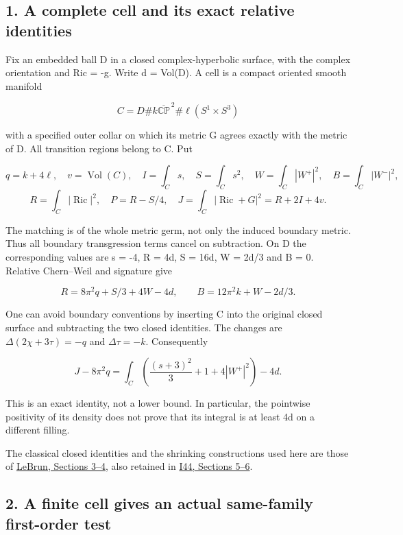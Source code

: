 \documentclass[
  10pt,
]{article}
\begin{document}
\hypertarget{a-complete-cell-and-its-exact-relative-identities}{%
\subsection{1. A complete cell and its exact relative
identities}\label{a-complete-cell-and-its-exact-relative-identities}}

Fix an embedded ball D in a closed complex-hyperbolic surface, with the
complex orientation and Ric = -g. Write d = Vol(D). A cell is a compact
oriented smooth manifold

\[
 C=D\#k\overline{\mathbb {CP}}^{\,2}\#\ell(S^1\times S^3)
\]

with a specified outer collar on which its metric G agrees exactly with
the metric of D. All transition regions belong to C. Put

\[
 q=k+4\ell,\quad v=\operatorname{Vol}(C),\quad
 I=\int_Cs,\quad S=\int_Cs^2,\quad
 W=\int_C|W^+|^2,\quad B=\int_C|W^-|^2,
\] \[
 R=\int_C|\operatorname{Ric}|^2,\quad
 P=R-S/4,\quad J=\int_C|\operatorname{Ric}+G|^2=R+2I+4v.
\]

The matching is of the whole metric germ, not only the induced boundary
metric. Thus all boundary transgression terms cancel on subtraction. On
D the corresponding values are s = -4, R = 4d, S = 16d, W = 2d/3 and B =
0. Relative Chern--Weil and signature give

\[
 \boxed{R=8\pi^2q+S/3+4W-4d,\qquad
 B=12\pi^2k+W-2d/3.}                                      \tag{1.1}
\]

One can avoid boundary conventions by inserting C into the original
closed surface and subtracting the two closed identities. The changes
are \(\Delta(2\chi+3\tau)=-q\) and \(\Delta\tau=-k\). Consequently

\[
 \boxed{J-8\pi^2q
 =\int_C\left(\frac{(s+3)^2}{3}+1+4|W^+|^2\right)-4d.}     \tag{1.2}
\]

This is an exact identity, not a lower bound. In particular, the
pointwise positivity of its density does not prove that its integral is
at least 4d on a different filling.

The classical closed identities and the shrinking constructions used
here are those of \href{https://arxiv.org/html/math/0003068}{LeBrun,
Sections 3--4}, also retained in
\href{20260927_covering_geometry_and_sharp_subfamilies.md}{I44, Sections
5--6}.

\hypertarget{a-finite-cell-gives-an-actual-same-family-first-order-test}{%
\subsection{2. A finite cell gives an actual same-family first-order
test}\label{a-finite-cell-gives-an-actual-same-family-first-order-test}}
\end{document}

